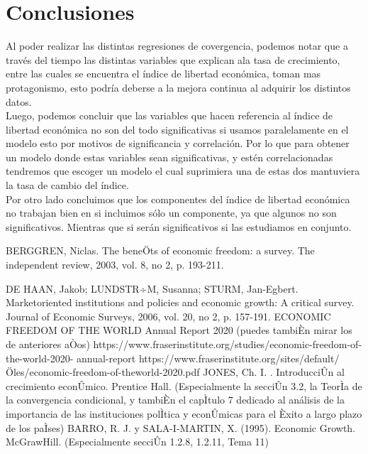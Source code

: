     \section*{Conclusiones}

    Al poder realizar las distintas regresiones de covergencia, podemos notar que a través del tiempo las distintas variables que explican ala tasa de crecimiento, entre las cuales se encuentra el índice de libertad económica, toman mas protagonismo, esto podría deberse a la mejora continua al adquirir los distintos datos.\\
    
    Luego, podemos concluir que las variables que hacen referencia al índice de libertad económica no son del todo significativas si usamos paralelamente en el modelo esto por motivos de significancia y correlación. Por lo que para obtener un modelo donde estas variables sean significativas, y estén correlacionadas tendremos que escoger un modelo el cual suprimiera una de estas dos mantuviera la tasa de cambio del índice.\\

    Por otro lado concluimos  que los componentes del índice de libertad económica no trabajan bien en si incluimos sólo un componente, ya que algunos no son significativos. Mientras que si serán significativos si las estudiamos en conjunto.\\


\let\cleardoublepage\clearpage

\begin{thebibliography}{10}

    \bibitem[1]{}BERGGREN, Niclas. The beneÖts of economic freedom: a survey. The independent review, 2003, vol. 8, no 2, p. 193-211.

    \bibitem[2]{}DE HAAN, Jakob; LUNDSTR÷M, Susanna; STURM, Jan-Egbert. Marketoriented institutions and policies and economic growth: A critical survey. Journal of Economic Surveys, 2006, vol. 20, no 2, p. 157-191.
    \bibitem[3]{}ECONOMIC FREEDOM OF THE WORLD Annual Report 2020 (puedes tambiÈn mirar los de anteriores aÒos) https://www.fraserinstitute.org/studies/economic-freedom-of-the-world-2020-
annual-report https://www.fraserinstitute.org/sites/default/Öles/economic-freedom-of-theworld-2020.pdf
    \bibitem[4]{}JONES, Ch. I. . IntroducciÛn al crecimiento econÛmico. Prentice Hall. (Especialmente la secciÛn 3.2, la TeorÌa de la convergencia condicional, y tambiÈn el capÌtulo 7 dedicado al análisis de la importancia de las instituciones polÌtica y econÛmicas para el Èxito a largo plazo de los paÌses)
    \bibitem[5]{}BARRO, R. J. y SALA-I-MARTIN, X. (1995). Economic Growth. McGrawHill. (Especialmente secciÛn 1.2.8, 1.2.11, Tema 11)
\end{thebibliography}


